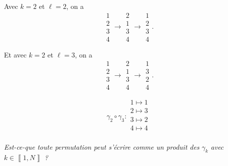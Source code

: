 Avec $k = 2$ et $\ell = 2$, on a \[
	\begin{array}{c}
		1\\2\\3\\4
	\end{array} \to \begin{array}{c}
		2\\1\\3\\4
	\end{array} \to \begin{array}{c}
		1\\2\\3\\4
	\end{array}.
\]

Et avec $k = 2$ et $\ell = 3$, on a \[
	\begin{array}{c}
		1\\2\\3\\4
	\end{array} \to \begin{array}{c}
		2\\1\\3\\4
	\end{array} \to \begin{array}{c}
		1\\3\\2\\4
	\end{array}.
\] 

\[
	\gamma_2 \circ \gamma_3 : \begin{array}{c}
		1\mapsto1\\
		2\mapsto3\\
		3\mapsto2\\
		4\mapsto4\\
	\end{array} 
\] 

\begin{center}
	{\itshape Est-ce-que toute permutation peut s'écrire comme un produit des $\gamma_k$ avec $k \in \left\llbracket 1,N \right\rrbracket$ ?}
\end{center}
